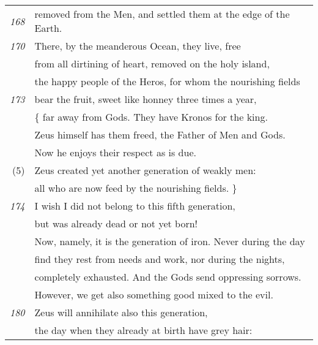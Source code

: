 \begin{tabular}[ht]{rl}
\footnotesize{\em 168}& removed from the Men, and settled them at the  edge of the Earth. \\
\footnotesize{\em 170}& There, by the meanderous Ocean, they live, free \\
& from all dirtining of heart, removed on the holy island, \\
& the happy people of the Heros, for whom the nourishing fields \\
\footnotesize{\em 173}& bear the fruit, sweet like honney three times a year,\\
& \{ far away from Gods. They have Kronos for the king. \\
& Zeus himself has them freed, the Father of Men and Gods. \\
& Now he enjoys their respect as is due. \\
(5)& Zeus created yet another generation of weakly men: \\
& all who are now feed by the nourishing fields.  \} \\
\footnotesize{\em 174}& I wish I did not belong to this fifth generation, \\
& but was already dead or not yet born! \\
& Now, namely, it is the generation of iron. Never during the day \\
& find they rest from needs and work, nor during the nights, \\
& completely exhausted. And the Gods send oppressing sorrows. \\
& However, we get also something good mixed to the evil. \\
\footnotesize{\em 180}& Zeus will annihilate also this generation, \\
& the day when they already at birth have grey hair: \\

\end{tabular}
